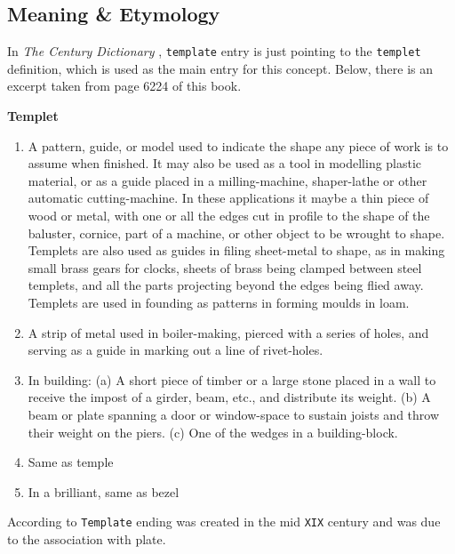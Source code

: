 \subsection{Meaning \& Etymology}

In \textit{The Century Dictionary} \cite[p.6224]{Whitney1906TheDictionary}, \texttt{template} entry is just pointing to the \texttt{templet} definition, which is used as the main entry for this concept. Below, there is an excerpt taken from page 6224 of this book.

\begin{bookQuote}
     \textbf{Templet} 
     
     \begin{enumerate}
         \item A pattern, guide, or model used to indicate the shape any piece of work is to assume when finished. It may also be used as a tool in modelling plastic material, or as a guide placed in a milling-machine, shaper-lathe or other automatic cutting-machine. In these applications it maybe a thin piece of wood or metal, with one or all the edges cut in profile to the shape of the baluster, cornice, part of a machine, or other object to be wrought to shape. Templets are also used as guides in filing sheet-metal to shape, as in making small brass gears for clocks, sheets of brass being clamped between steel templets, and all the parts projecting beyond the edges being flied away. Templets are used in founding as patterns in forming moulds in loam.
         
         \item A strip of metal used in boiler-making, pierced with a series of holes, and serving as a guide in marking out a line of rivet-holes.
         \item In building: (a) A short piece of timber or a large stone placed in a wall to receive the impost of a girder, beam, etc., and distribute its weight. (b) A beam or plate spanning a door or window-space to sustain joists and throw their weight on the piers. (c) One of the wedges in a building-block.
         \item Same as temple
         \item In a brilliant, same as bezel
     \end{enumerate}
\end{bookQuote}

According to \cite{Barnhart1988TheEtymology} \texttt{Template} ending was created in the mid \texttt{XIX} century and was due to the association with plate. 

